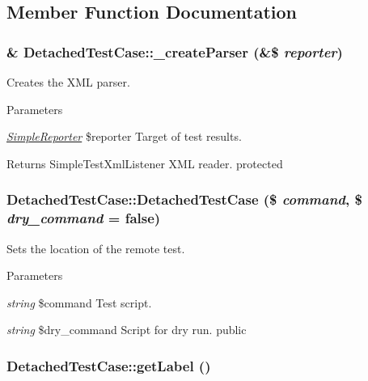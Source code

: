 \subsection{Member Function Documentation}
\hypertarget{class_detached_test_case_ab06be38d7d473fdb0db7267eff27bfce}{
\subsubsection[{\_\-createParser}]{\setlength{\rightskip}{0pt plus 5cm}\& DetachedTestCase::\_\-createParser (\&\$ {\em reporter})}}
\label{class_detached_test_case_ab06be38d7d473fdb0db7267eff27bfce}
Creates the XML parser. 
\begin{DoxyParams}{Parameters}
\item[{\em \hyperlink{class_simple_reporter}{SimpleReporter}}]\$reporter Target of test results. \end{DoxyParams}
\begin{DoxyReturn}{Returns}
SimpleTestXmlListener XML reader.  protected 
\end{DoxyReturn}
\hypertarget{class_detached_test_case_ae9ad4ef5b84ccbeaa2ea8ebc297985ec}{
\subsubsection[{DetachedTestCase}]{\setlength{\rightskip}{0pt plus 5cm}DetachedTestCase::DetachedTestCase (\$ {\em command}, \/  \$ {\em dry\_\-command} = {\ttfamily false})}}
\label{class_detached_test_case_ae9ad4ef5b84ccbeaa2ea8ebc297985ec}
Sets the location of the remote test. 
\begin{DoxyParams}{Parameters}
\item[{\em string}]\$command Test script. \item[{\em string}]\$dry\_\-command Script for dry run.  public \end{DoxyParams}
\hypertarget{class_detached_test_case_a89ea35beebfe6a648e60f40c2828eac6}{
\subsubsection[{getLabel}]{\setlength{\rightskip}{0pt plus 5cm}DetachedTestCase::getLabel ()}}
